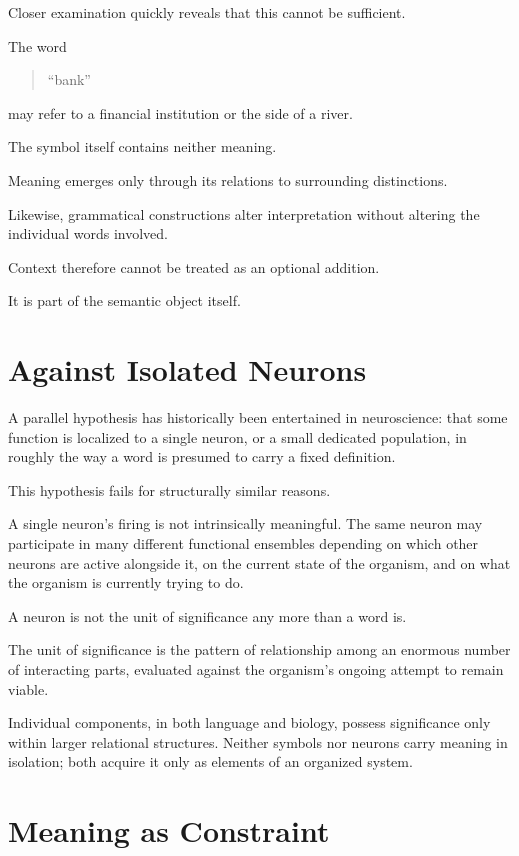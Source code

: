 \documentclass[11pt,oneside]{book}
\numberwithin{equation}{chapter}
\theoremstyle{definition}
\theoremstyle{plain}
\begin{document}
Closer examination quickly reveals that this cannot be sufficient.

The word

\begin{quote}
``bank''
\end{quote}

may refer to a financial institution or the side of a river.

The symbol itself contains neither meaning.

Meaning emerges only through its relations to surrounding distinctions.

Likewise, grammatical constructions alter interpretation without altering
the individual words involved.

Context therefore cannot be treated as an optional addition.

It is part of the semantic object itself.

\section{Against Isolated Neurons}

A parallel hypothesis has historically been entertained in neuroscience: that
some function is localized to a single neuron, or a small dedicated
population, in roughly the way a word is presumed to carry a fixed
definition.

This hypothesis fails for structurally similar reasons.

A single neuron's firing is not intrinsically meaningful. The same neuron
may participate in many different functional ensembles depending on which
other neurons are active alongside it, on the current state of the organism,
and on what the organism is currently trying to do.

A neuron is not the unit of significance any more than a word is.

The unit of significance is the pattern of relationship among an enormous
number of interacting parts, evaluated against the organism's ongoing
attempt to remain viable.

Individual components, in both language and biology, possess significance
only within larger relational structures. Neither symbols nor neurons carry
meaning in isolation; both acquire it only as elements of an organized
system.

\section{Meaning as Constraint}
\end{document}
